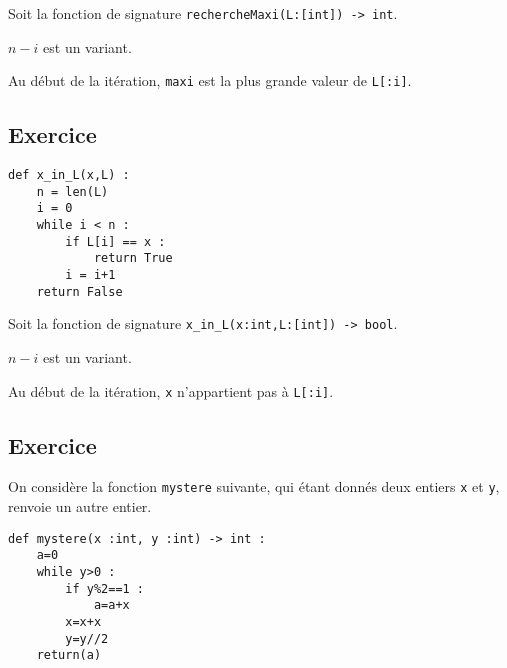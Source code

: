 Soit la fonction de signature \lstinline{rechercheMaxi(L:[int]) -> int}.

\ifprof
\begin{corrige}
$n-i$ est un variant.
\end{corrige}
\else
\fi

\ifprof
\begin{corrige}
Au début de la \ieme itération, \texttt{maxi} est la plus grande valeur de \texttt{L[:i]}. 
\end{corrige}
\else
\fi

\subsection*{Exercice}

\begin{marginfigure}
\begin{lstlisting}
def x_in_L(x,L) :
    n = len(L)
    i = 0
    while i < n :
        if L[i] == x :
            return True
        i = i+1
    return False
\end{lstlisting}
\end{marginfigure}

Soit la fonction de signature \lstinline{x_in_L(x:int,L:[int]) -> bool}.

\ifprof
\begin{corrige}
$n-i$ est un variant.
\end{corrige}
\else
\fi

\ifprof
\begin{corrige}
Au début de la \ieme itération, \texttt{x} n'appartient pas à \texttt{L[:i]}. 
\end{corrige}
\else
\fi



\subsection*{Exercice}

On considère la fonction \texttt{mystere} suivante, qui étant donnés deux entiers \texttt{x} et \texttt{y}, renvoie un autre
entier.
\begin{lstlisting}
def mystere(x :int, y :int) -> int :
    a=0
    while y>0 :
        if y%2==1 :
            a=a+x
        x=x+x
        y=y//2
    return(a)
\end{lstlisting}

